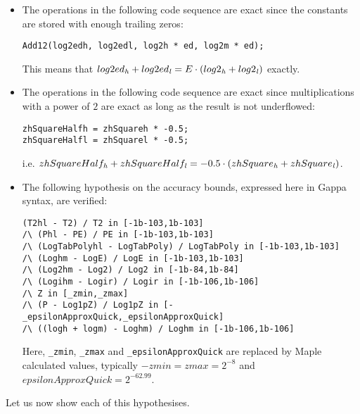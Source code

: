\begin{itemize}
\item The operations in the following code sequence are exact since the constants are stored with enough trailing zeros:
\begin{lstlisting}[caption={Multiplication by $E$},firstnumber=50]
Add12(log2edh, log2edl, log2h * ed, log2m * ed);
\end{lstlisting}
This means that $log2ed_{\mathit{h}} + log2ed_{\mathit{l}} = E \cdot \left( log2_{\mathit{h}} + log2_{\mathit{l}} \right)$ exactly.
\item The operations in the following code sequence are exact since multiplications with a power of $2$ are exact
as long as the result is not underflowed:
\begin{lstlisting}[caption={Multiplication by $-0.5$},firstnumber=60]
zhSquareHalfh = zhSquareh * -0.5;
zhSquareHalfl = zhSquarel * -0.5;
\end{lstlisting}
i.e. $zhSquareHalf_{\mathit{h}} + zhSquareHalf_{\mathit{l}} = -0.5 \cdot \left( zhSquare_{\mathit{h}} + zhSquare_{\mathit{l}} \right)$.
\item The following hypothesis on the accuracy bounds, expressed here in Gappa syntax, are verified:
\begin{lstlisting}[caption={Gappa hypothesis},firstnumber=100]
(T2hl - T2) / T2 in [-1b-103,1b-103]
/\ (Phl - PE) / PE in [-1b-103,1b-103]
/\ (LogTabPolyhl - LogTabPoly) / LogTabPoly in [-1b-103,1b-103]
/\ (Loghm - LogE) / LogE in [-1b-103,1b-103]
/\ (Log2hm - Log2) / Log2 in [-1b-84,1b-84]
/\ (Logihm - Logir) / Logir in [-1b-106,1b-106]
/\ Z in [_zmin,_zmax]
/\ (P - Log1pZ) / Log1pZ in [-_epsilonApproxQuick,_epsilonApproxQuick]
/\ ((logh + logm) - Loghm) / Loghm in [-1b-106,1b-106]
\end{lstlisting}
Here, {\tt \_zmin}, {\tt \_zmax} and {\tt \_epsilonApproxQuick} are replaced by Maple calculated values, typically
$-zmin = zmax = 2^{-8}$ and $epsilonApproxQuick = 2^{-62.99}$.
\end{itemize}
Let us now show each of this hypothesises. 
